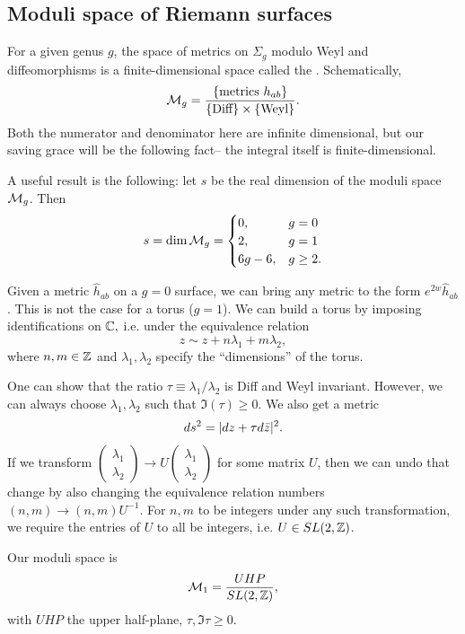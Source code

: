 \subsection*{Moduli space of Riemann surfaces} For a given genus $g$, the space of metrics on $\Sigma_g$ modulo Weyl and diffeomorphisms is a finite-dimensional space called the . Schematically,
\begin{equation*}
    \mathcal{M}_g = \frac{\{\text{metrics }h_{ab}\}}{\{\text{Diff}\}\times \{\text{Weyl}\}}.
\end{equation*}
Both the numerator and denominator here are infinite dimensional, but our saving grace will be the following fact-- the integral itself is finite-dimensional.

A useful result is the following: let $s$ be the real dimension of the moduli space $\mathcal{M}_g$. Then
\begin{equation}
    s=\dim \mathcal{M}_g =\begin{cases}
    0, & g=0\\
    2, & g=1\\
    6g-6, & g\geq 2.
    \end{cases}
\end{equation}

\begin{exm}
    Given a metric $\hat h_{ab}$ on a $g=0$ surface, we can bring any metric to the form $e^{2w}\hat h_{ab}$. This is not the case for a torus ($g=1$). We can build a torus by imposing identifications on $\mathbb{C},$ i.e. under the equivalence relation
    \begin{equation}
        z\sim z + n \lambda_1 + m\lambda_2,
    \end{equation}
    where $n,m\in \mathbb{Z}$ and $\lambda_1,\lambda_2$ specify the ``dimensions'' of the torus.
    
    One can show that the ratio $\tau\equiv \lambda_1/\lambda_2$ is Diff and Weyl invariant. However, we can always choose $\lambda_1,\lambda_2$ such that $\Im (\tau)\geq 0$. We also get a metric
    \begin{equation}
        ds^2=\lvert dz+\tau d\bar z\rvert^2.
    \end{equation}
    If we transform $\begin{pmatrix}\lambda_1 \\ \lambda_2\end{pmatrix}\to U\begin{pmatrix}\lambda_1 \\ \lambda_2\end{pmatrix}$ for some matrix $U$, then we can undo that change by also changing the equivalence relation numbers $(n,m)\to (n,m)U^{-1}$. For $n,m$ to be integers under any such transformation, we require the entries of $U$ to all be integers, i.e. $U\in SL(2,\mathbb{Z})$.
    
    Our moduli space is
    \begin{equation}
        \mathcal{M}_1 = \frac{UHP}{SL(2,\mathbb{Z})},
    \end{equation}
    with $UHP$ the upper half-plane, $\tau,\Im \tau \geq 0$.
\end{exm}